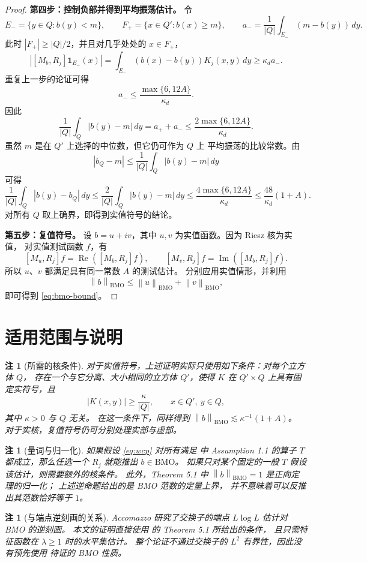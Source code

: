 \documentclass[UTF8,fontset=fandol,a4paper,11pt]{ctexart}
\newtheorem{remark}[theorem]{注}
\newcommand{\BMO}{\mathrm{BMO}}
\newcommand{\one}{\mathbf 1}
\newcommand{\norm}[1]{\left\lVert#1\right\rVert}
\begin{document}
\begin{proof}
\medskip
\noindent\textbf{第四步：控制负部并得到平均振荡估计。}
令
\[
 E_-=\{y\in Q:b(y)<m\},
 \qquad F_+=\{x\in Q':b(x)\ge m\},
 \qquad
 a_-=\frac1{|Q|}\int_{E_-}(m-b(y))\,dy.
\]
此时 $|F_+|\ge|Q|/2$，并且对几乎处处的 $x\in F_+$，
\[
 |[M_b,R_j]\one_{E_-}(x)|
 =\int_{E_-}(b(x)-b(y))K_j(x,y)\,dy
 \ge\kappa_da_-.
\]
重复上一步的论证可得
\[
 a_-\le\frac{\max\{6,12A\}}{\kappa_d}.
\]
因此
\[
 \frac1{|Q|}\int_Q|b(y)-m|\,dy
 =a_++a_-
 \le\frac{2\max\{6,12A\}}{\kappa_d}.
\]
虽然 $m$ 是在 $Q'$ 上选择的中位数，但它仍可作为 $Q$ 上
平均振荡的比较常数。由
\[
 |b_Q-m|\le\frac1{|Q|}\int_Q|b(y)-m|\,dy
\]
可得
\[
 \frac1{|Q|}\int_Q|b(y)-b_Q|\,dy
 \le\frac2{|Q|}\int_Q|b(y)-m|\,dy
 \le\frac{4\max\{6,12A\}}{\kappa_d}
 \le\frac{48}{\kappa_d}(1+A).
\]
对所有 $Q$ 取上确界，即得到实值符号的结论。

\medskip
\noindent\textbf{第五步：复值符号。}
设 $b=u+iv$，其中 $u,v$ 为实值函数。因为 Riesz 核为实值，
对实值测试函数 $f$，有
\[
 [M_u,R_j]f=\operatorname{Re}([M_b,R_j]f),
 \qquad
 [M_v,R_j]f=\operatorname{Im}([M_b,R_j]f).
\]
所以 $u$、$v$ 都满足具有同一常数 $A$ 的测试估计。
分别应用实值情形，并利用
\[
 \norm{b}_{\BMO}
 \le\norm{u}_{\BMO}+\norm{v}_{\BMO},
\]
即可得到 \eqref{eq:bmo-bound}。
\end{proof}

\section{适用范围与说明}

\begin{remark}[所需的核条件]
对于实值符号，上述证明实际只使用如下条件：对每个立方体 $Q$，
存在一个与它分离、大小相同的立方体 $Q'$，使得 $K$
在 $Q'\times Q$ 上具有固定实符号，且
\[
 |K(x,y)|\ge\frac{\kappa}{|Q|},\qquad x\in Q',\ y\in Q,
\]
其中 $\kappa>0$ 与 $Q$ 无关。
在这一条件下，同样得到 $\norm{b}_{\BMO}\lesssim\kappa^{-1}(1+A)$。
对于实核，复值符号仍可分别处理实部与虚部。
\end{remark}

\begin{remark}[量词与归一化]
如果假设 \eqref{eq:wcp} 对所有满足 \cite{SYZZ} 中
Assumption 1.1 的算子 $T$ 都成立，那么任选一个 $R_j$
就能推出 $b\in\BMO$。
如果只对某个固定的一般 $T$ 假设该估计，则需要额外的核条件。
此外，Theorem 5.1 中 $\norm{b}_{\BMO}=1$ 是正向定理的归一化；
上述逆命题给出的是 BMO 范数的定量上界，
并不意味着可以反推出其范数恰好等于 $1$。
\end{remark}

\begin{remark}[与端点逆刻画的关系]
Accomazzo \cite{Accomazzo} 研究了交换子的端点 $L\log L$
估计对 BMO 的逆刻画。
本文的证明直接使用 \cite{SYZZ} 的 Theorem 5.1 所给出的条件，
且只需特征函数在 $\lambda\ge1$ 时的水平集估计。
整个论证不通过交换子的 $L^2$ 有界性，因此没有预先使用
待证的 BMO 性质。
\end{remark}
\end{document}
